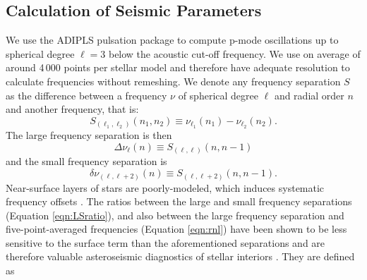 \documentclass[manuscript,linenumbers]{aastex6}
\begin{document}


\subsection{Calculation of Seismic Parameters}
\label{sec:seis}
We use the ADIPLS pulsation package \citep{2008ApSS.316..113C} to compute p-mode oscillations up to spherical degree $\ell=3$ below the acoustic cut-off frequency. We use on average of around 4\,000 points per stellar model and therefore have adequate resolution to calculate frequencies without remeshing. We denote any frequency separation $S$ as the difference between a frequency $\nu$ of spherical degree $\ell$ and radial order $n$ and another frequency, that is: 
\begin{equation} 
  S_{(\ell_1, \ell_2)}(n_1, n_2) \equiv \nu_{\ell_1}(n_1) - \nu_{\ell_2}(n_2).
\end{equation}
The large frequency separation is then
\begin{equation} 
  \Delta\nu_\ell(n) \equiv S_{(\ell, \ell)}(n, n-1)
\end{equation}
and the small frequency separation is
\begin{equation}
  \delta\nu_{(\ell, \ell+2)}(n) \equiv S_{(\ell, \ell+2)}(n, n-1).
\end{equation}
Near-surface layers of stars are poorly-modeled, which induces systematic frequency offsets \citep[see e.g.][]{1999AA...351..689R}. The ratios between the large and small frequency separations (Equation \ref{eqn:LSratio}), and also between the large frequency separation and five-point-averaged frequencies (Equation \ref{eqn:rnl}) have been shown to be less sensitive to the surface term than the aforementioned separations and are therefore valuable asteroseismic diagnostics of stellar interiors \citep{2003AA...411..215R}. They are defined as
\end{document}
